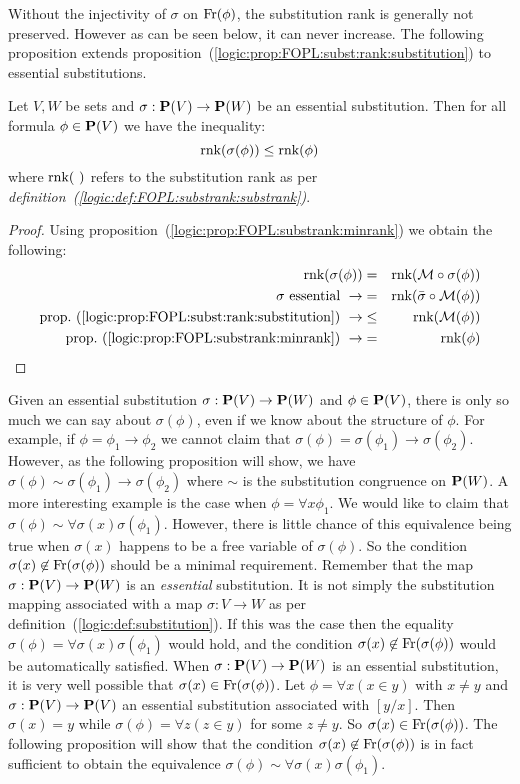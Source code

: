 Without the injectivity of $\sigma$ on $\mbox{\rm Fr}(\phi)$, the
substitution rank is generally not preserved. However as can be seen
below, it can never increase. The following proposition extends
proposition~(\ref{logic:prop:FOPL:subst:rank:substitution}) to
essential substitutions.
\begin{prop}\label{logic:prop:FOPL:esssubstprop:rank:less}
Let $V,W$ be sets and $\sigma:\mbox{${\bf P}(V)$}\to{\bf P}(W)$ be an essential
substitution. Then for all formula $\phi\in\mbox{${\bf P}(V)$}$ we have the
inequality:
    \[
    \mbox{\rm rnk}(\sigma(\phi))\leq\mbox{\rm rnk}(\phi)
    \]
where $\mbox{\rm rnk}(\,\,)$ refers to the substitution rank as per {\em
definition~(\ref{logic:def:FOPL:substrank:substrank})}.
\end{prop}
\begin{proof}
Using proposition~(\ref{logic:prop:FOPL:substrank:minrank}) we
obtain the following:
    \begin{eqnarray*}
    \rnk(\sigma(\phi))&=&\rnk({\cal M}\circ\sigma(\phi))\\
    \mbox{$\sigma$ essential}\ \rightarrow
    &=&\rnk(\bar{\sigma}\circ{\cal M}(\phi))\\
    \mbox{prop.~(\ref{logic:prop:FOPL:subst:rank:substitution})}\ \rightarrow
    &\leq&\rnk({\cal M}(\phi))\\
    \mbox{prop.~(\ref{logic:prop:FOPL:substrank:minrank})}\ \rightarrow
    &=&\rnk(\phi)
    \end{eqnarray*}
\end{proof}

Given an essential substitution $\sigma:\mbox{${\bf P}(V)$}\to{\bf P}(W)$ and
$\phi\in\mbox{${\bf P}(V)$}$, there is only so much we can say about $\sigma(\phi)$,
even if we know about the structure of $\phi$. For example, if
$\phi=\phi_{1}\to\phi_{2}$ we cannot claim that
$\sigma(\phi)=\sigma(\phi_{1})\to\sigma(\phi_{2})$. However, as the
following proposition will show, we have
$\sigma(\phi)\sim\sigma(\phi_{1})\to\sigma(\phi_{2})$ where $\sim$
is the substitution congruence on ${\bf P}(W)$. A more interesting
example is the case when $\phi=\forall x\phi_{1}$. We would like to
claim that $\sigma(\phi)\sim\forall\sigma(x)\sigma(\phi_{1})$.
However, there is little chance of this equivalence being true when
$\sigma(x)$ happens to be a free variable of $\sigma(\phi)$. So the
condition $\sigma(x)\not\in\mbox{\rm Fr}(\sigma(\phi))$ should be a minimal
requirement. Remember that the map $\sigma:\mbox{${\bf P}(V)$}\to{\bf P}(W)$ is an
{\em essential} substitution. It is not simply the substitution
mapping associated with a map $\sigma:V\to W$ as per
definition~(\ref{logic:def:substitution}). If this was the case then
the equality $\sigma(\phi)=\forall\sigma(x)\sigma(\phi_{1})$ would
hold, and the condition $\sigma(x)\not\in\mbox{\rm Fr}(\sigma(\phi))$ would
be automatically satisfied. When $\sigma:\mbox{${\bf P}(V)$}\to{\bf P}(W)$ is an
essential substitution, it is very well possible that
$\sigma(x)\in\mbox{\rm Fr}(\sigma(\phi))$. Let $\phi=\forall x(x\in y)$ with
$x\neq y$ and $\sigma:\mbox{${\bf P}(V)$}\to\mbox{${\bf P}(V)$}$ an essential substitution
associated with $[y/x]$. Then $\sigma(x)=y$ while
$\sigma(\phi)=\forall z(z\in y)$ for some $z\neq y$. So
$\sigma(x)\in\mbox{\rm Fr}(\sigma(\phi))$. The following proposition will
show that the condition $\sigma(x)\not\in\mbox{\rm Fr}(\sigma(\phi))$ is in
fact sufficient to obtain the equivalence
$\sigma(\phi)\sim\forall\sigma(x)\sigma(\phi_{1})$.

